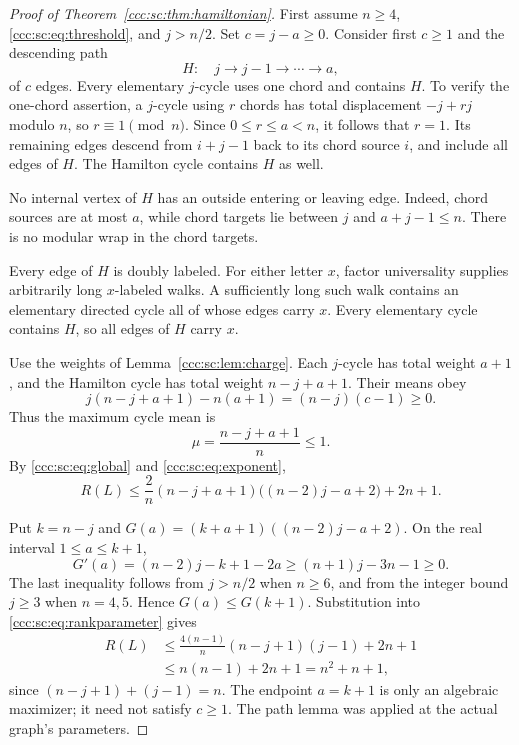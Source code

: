 \documentclass[11pt,letterpaper]{article}
\theoremstyle{definition}
\theoremstyle{remark}
\begin{document}
\begin{proof}[Proof of Theorem~\ref{ccc:sc:thm:hamiltonian}]
First assume $n\ge4$, \eqref{ccc:sc:eq:threshold}, and $j>n/2$. Set $c=j-a\ge0$. Consider first $c\ge1$ and the descending path
\[
 H:\quad j\longrightarrow j-1\longrightarrow\cdots\longrightarrow a,
\]
of $c$ edges. Every elementary $j$-cycle uses one chord and contains $H$. To verify the one-chord assertion, a $j$-cycle using $r$ chords has total displacement $-j+rj$ modulo $n$, so $r\equiv1\pmod n$. Since $0\le r\le a<n$, it follows that $r=1$. Its remaining edges descend from $i+j-1$ back to its chord source $i$, and include all edges of $H$. The Hamilton cycle contains $H$ as well.

No internal vertex of $H$ has an outside entering or leaving edge. Indeed, chord sources are at most $a$, while chord targets lie between $j$ and $a+j-1\le n$. There is no modular wrap in the chord targets.

Every edge of $H$ is doubly labeled. For either letter $x$, factor universality supplies arbitrarily long $x$-labeled walks. A sufficiently long such walk contains an elementary directed cycle all of whose edges carry $x$. Every elementary cycle contains $H$, so all edges of $H$ carry $x$.

Use the weights of Lemma~\ref{ccc:sc:lem:charge}. Each $j$-cycle has total weight $a+1$, and the Hamilton cycle has total weight $n-j+a+1$. Their means obey
\[
 j(n-j+a+1)-n(a+1)=(n-j)(c-1)\ge0.
\]
Thus the maximum cycle mean is
\[
 \mu=\frac{n-j+a+1}{n}\le1.
\]
By \eqref{ccc:sc:eq:global} and \eqref{ccc:sc:eq:exponent},
\begin{equation}\label{ccc:sc:eq:rankparameter}
 R(L)\le\frac{2}{n}(n-j+a+1)\bigl((n-2)j-a+2\bigr)+2n+1.
\end{equation}

Put $k=n-j$ and $G(a)=(k+a+1)((n-2)j-a+2)$. On the real interval $1\le a\le k+1$,
\[
 G'(a)=(n-2)j-k+1-2a\ge(n+1)j-3n-1\ge0.
\]
The last inequality follows from $j>n/2$ when $n\ge6$, and from the integer bound $j\ge3$ when $n=4,5$. Hence $G(a)\le G(k+1)$. Substitution into \eqref{ccc:sc:eq:rankparameter} gives
\begin{align*}
 R(L)&\le\frac{4(n-1)}{n}(n-j+1)(j-1)+2n+1\\
     &\le n(n-1)+2n+1=n^2+n+1,
\end{align*}
since $(n-j+1)+(j-1)=n$. The endpoint $a=k+1$ is only an algebraic maximizer; it need not satisfy $c\ge1$. The path lemma was applied at the actual graph's parameters.


\end{proof}
\end{document}
